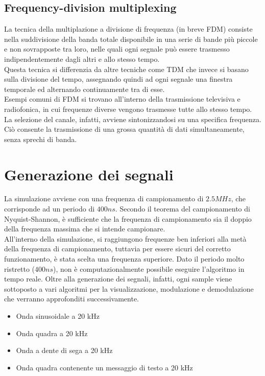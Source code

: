 \documentclass{article}
\begin{document}
\subsection{Frequency-division multiplexing}
La tecnica della multiplazione a divisione di frequenza (in breve FDM) consiste nella suddivisione della banda totale disponibile
in una serie di bande più piccole e non sovrapposte tra loro, nelle quali ogni segnale può essere trasmesso indipendentemente
dagli altri e allo stesso tempo.\\
Questa tecnica si differenzia da altre tecniche come TDM che invece si basano sulla divisione del tempo, assegnando quindi
ad ogni segnale una finestra temporale ed alternando continuamente tra di esse.\\
Esempi comuni di FDM si trovano all'interno della trasmissione televisiva e radiofonica, in cui frequenze diverse vengono
trasmesse tutte allo stesso tempo. La selezione del canale, infatti, avviene sintonizzandosi su una specifica frequenza.
Ciò consente la trasmissione di una grossa quantità di dati simultaneamente, senza sprechi di banda.

\section{Generazione dei segnali}
La simulazione avviene con una frequenza di campionamento di $2.5 MHz$, che corrisponde ad un periodo di $400 ns$. Secondo il
teorema del campionamento di Nyquist-Shannon, è sufficiente che la frequenza di campionamento sia il doppio della frequenza
massima che si intende campionare.\\
All'interno della simulazione, si raggiungono frequenze ben inferiori alla metà della frequenza di campionamento, tuttavia
per essere sicuri del corretto funzionamento, è stata scelta una frequenza superiore. Dato il periodo molto ristretto ($400 ns$),
non è computazionalmente possibile eseguire l'algoritmo in tempo reale. Oltre alla generazione dei segnali, infatti, ogni
sample viene sottoposto a vari algoritmi per la visualizzazione, modulazione e demodulazione che verranno approfonditi
successivamente.\\

\begin{itemize}
    \item Onda sinusoidale a 20 kHz
    \item Onda quadra a 20 kHz
    \item Onda a dente di sega a 20 kHz
    \item Onda quadra contenente un messaggio di testo a 20 kHz
\end{itemize}
\end{document}
